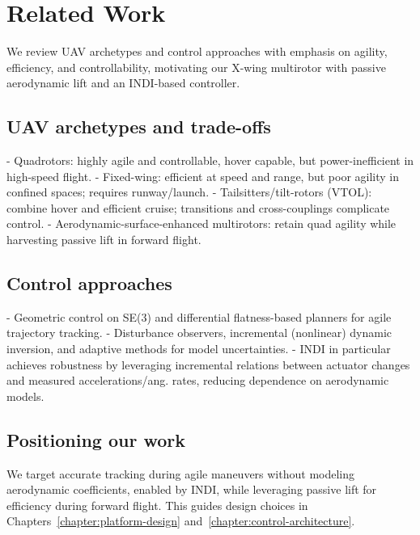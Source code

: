 
\chapter{Related Work}\label{chapter:related-work}

We review UAV archetypes and control approaches with emphasis on agility, efficiency, and controllability, motivating our X-wing multirotor with passive aerodynamic lift and an INDI-based controller.

\section{UAV archetypes and trade-offs}
- Quadrotors: highly agile and controllable, hover capable, but power-inefficient in high-speed flight.
- Fixed-wing: efficient at speed and range, but poor agility in confined spaces; requires runway/launch.
- Tailsitters/tilt-rotors (VTOL): combine hover and efficient cruise; transitions and cross-couplings complicate control.
- Aerodynamic-surface-enhanced multirotors: retain quad agility while harvesting passive lift in forward flight.

\section{Control approaches}
- Geometric control on SE(3) and differential flatness-based planners for agile trajectory tracking.
- Disturbance observers, incremental (nonlinear) dynamic inversion, and adaptive methods for model uncertainties.
- INDI in particular achieves robustness by leveraging incremental relations between actuator changes and measured accelerations/ang. rates, reducing dependence on aerodynamic models.

\section{Positioning our work}
We target accurate tracking during agile maneuvers without modeling aerodynamic coefficients, enabled by INDI, while leveraging passive lift for efficiency during forward flight. This guides design choices in Chapters~\ref{chapter:platform-design} and~\ref{chapter:control-architecture}.
